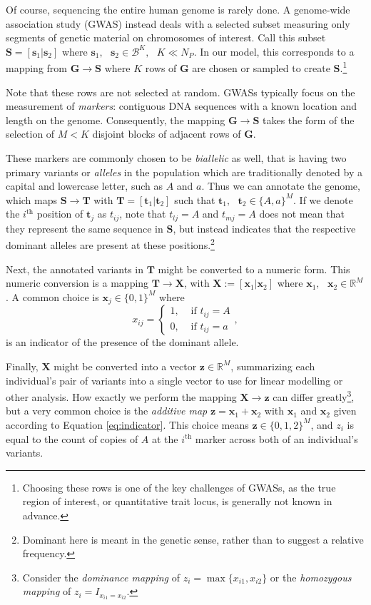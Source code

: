\documentclass{article}
\newcommand{\ve}[1]{\mathbf{#1}}           %
\newcommand{\m}[1]{\mathbf{#1}}               %
\newcommand{\field}[1]{\mathbb{#1}}
\newcommand{\Reals}{\field{R}}
\begin{document}
Of course, sequencing the entire human genome is rarely done. A genome-wide association study (GWAS) instead deals with a selected subset measuring only segments of genetic material on chromosomes of interest. Call this subset $\m{S} = [\ve{s}_1 | \ve{s}_2]$ where $\ve{s}_1, \text{ } \ve{s}_2 \in \mathcal{B}^K, \text{ } K \ll N_P$. In our model, this corresponds to a mapping from $\m{G} \rightarrow \m{S}$ where $K$ rows of $\m{G}$ are chosen or sampled to create $\m{S}$.\footnote{Choosing these rows is one of the key challenges of GWASs, as the true region of interest, or quantitative trait locus, is generally not known in advance.}

Note that these rows are not selected at random. GWASs typically focus on the measurement of \textit{markers}: contiguous DNA sequences with a known location and length on the genome. Consequently, the mapping $\m{G} \rightarrow \m{S}$ takes the form of the selection of $M < K$ disjoint blocks of adjacent rows of $\m{G}$. 

These markers are commonly chosen to be \textit{biallelic} as well, that is having two primary variants or \textit{alleles} in the population which are traditionally denoted by a capital and lowercase letter, such as $A$ and $a$. Thus we can annotate the genome, which maps $\m{S} \rightarrow \m{T}$ with $\m{T} = [\ve{t}_1 | \ve{t}_2]$ such that $\ve{t}_1, \text{ } \ve{t}_2 \in \{A,a\}^M$. If we denote the $i^{\text{th}}$ position of $\ve{t}_j$ as $t_{ij}$, note that $t_{lj} = A$ and $t_{mj} = A$ does not mean that they represent the same sequence in $\m{S}$, but instead indicates that the respective dominant alleles are present at these positions.\footnote{Dominant here is meant in the genetic sense, rather than to suggest a relative frequency.}

Next, the annotated variants in $\m{T}$ might be converted to a numeric form. This numeric conversion is a mapping $\m{T} \rightarrow \m{X}$, with $\m{X} := [\ve{x}_1 | \ve{x}_2]$ where $\ve{x}_1, \text{ } \ve{x}_2 \in \Reals^M$. A common choice is $\ve{x}_j \in \{0,1\}^M$ where
\begin{equation} \label{eq:indicator}
x_{ij} = \begin{cases}
  1, & \text{ if } t_{ij} = A \\
  0, & \text{ if } t_{ij} = a
\end{cases},
\end{equation}
is an indicator of the presence of the dominant allele.

Finally, $\m{X}$ might be converted into a vector $\ve{z} \in \Reals^M$, summarizing each individual's pair of variants into a single vector to use for linear modelling or other analysis. How exactly we perform the mapping $\m{X} \rightarrow \ve{z}$ can differ greatly\footnote{Consider the \textit{dominance mapping} of $z_i = \max\{x_{i1}, x_{i2}\}$ or the \textit{homozygous mapping} of $z_i = I_{x_{i1} = x_{i2}}$.}, but a very common choice is the \textit{additive map} $\ve{z} = \ve{x}_1 + \ve{x}_2$ with $\ve{x}_1$ and $\ve{x}_2$ given according to Equation \ref{eq:indicator}. This choice means $\ve{z} \in \{0,1,2\}^M$, and $z_i$ is equal to the count of copies of $A$ at the $i^{\text{th}}$ marker across both of an individual's variants.
\end{document}

